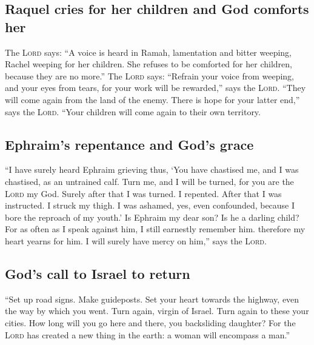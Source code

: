 \hypertarget{raquel-cries-for-her-children-and-god-comforts-her}{%
\subsection{Raquel cries for her children and God comforts
her}\label{raquel-cries-for-her-children-and-god-comforts-her}}

 The \textsc{Lord} says: ``A voice is heard in Ramah,
lamentation and bitter weeping, Rachel weeping for her children. She
refuses to be comforted for her children, because they are no more.''
 The \textsc{Lord} says: ``Refrain your voice from
weeping, and your eyes from tears, for your work will be rewarded,''
says the \textsc{Lord}. ``They will come again from the land of the
enemy.  There is hope for your latter end,'' says the
\textsc{Lord}. ``Your children will come again to their own territory.

\hypertarget{ephraims-repentance-and-gods-grace}{%
\subsection{Ephraim's repentance and God's
grace}\label{ephraims-repentance-and-gods-grace}}

 ``I have surely heard Ephraim grieving thus, `You have
chastised me, and I was chastised, as an untrained calf. Turn me, and I
will be turned, for you are the \textsc{Lord} my God. 
Surely after that I was turned. I repented. After that I was instructed.
I struck my thigh. I was ashamed, yes, even confounded, because I bore
the reproach of my youth.'  Is Ephraim my dear son? Is he
a darling child? For as often as I speak against him, I still earnestly
remember him. therefore my heart yearns for him. I will surely have
mercy on him,'' says the \textsc{Lord}.

\hypertarget{gods-call-to-israel-to-return}{%
\subsection{God's call to Israel to
return}\label{gods-call-to-israel-to-return}}

 ``Set up road signs. Make guideposts. Set your heart
towards the highway, even the way by which you went. Turn again, virgin
of Israel. Turn again to these your cities.  How long
will you go here and there, you backsliding daughter? For the
\textsc{Lord} has created a new thing in the earth: a woman will
encompass a man.''

